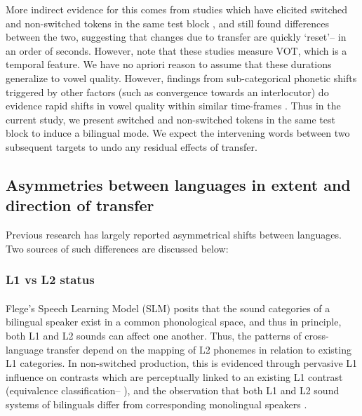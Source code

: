\documentclass[11pt]{article}
\begin{document}
More indirect evidence for this comes from studies which have elicited switched and non-switched tokens in the same test block \cite{tsui2019impact,olson2013bilingual}, and still found differences between the two, suggesting that changes due to transfer are quickly `reset'-- in an order of seconds. However, note that these studies measure VOT, which is a temporal feature. We have no apriori reason to assume that these durations generalize to vowel quality. However, findings from sub-categorical phonetic shifts triggered by other factors (such as convergence towards an interlocutor) do evidence rapid shifts in vowel quality within similar time-frames \cite{pardo2010expressing,babel2010dialect,babel2012evidence}. Thus in the current study, we present switched and non-switched tokens in the same test block to induce a bilingual mode. We expect the intervening words between two subsequent targets to undo any residual effects of transfer.


\subsection{Asymmetries between languages in extent and direction of transfer} \label{asymmetries}
Previous research has largely reported asymmetrical shifts between languages. Two sources of such differences are discussed below: 

\subsubsection{L1 vs L2 status} 
\paragraph{}Flege's Speech Learning Model (SLM) \citeyear{flege1995second,flege2007language} posits that the sound categories of a bilingual speaker exist in a common phonological space, and thus in principle, both L1 and L2 sounds can affect one another. Thus, the patterns of cross-language transfer depend on the mapping of L2 phonemes in relation to existing L1 categories. In non-switched production, this is evidenced through pervasive L1 influence on contrasts which are perceptually linked to an existing L1 contrast (equivalence classification-- ), and
the observation that both L1 and L2 sound systems of bilinguals differ from corresponding monolingual speakers \cite{guion2003vowel}. 
\end{document}
